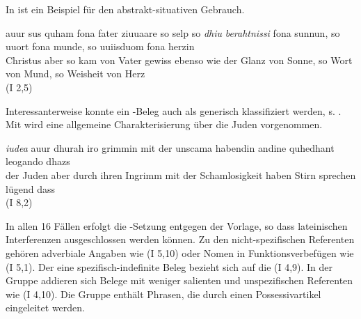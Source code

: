 In  ist ein Beispiel für den abstrakt-situativen  Gebrauch. 
%
\begin{exe}
\ex \label{ex:I683}  {auur} {sus} {quham} {fona} {fater} {ziuuaare} {so selp so} {\textit{dhiu}} {\textit{berahtnissi}} {fona} {sunnun}, {so} {uuort} {fona} {munde}, {so} {uuiisduom} {fona} {herzin} \\
{Christus} {aber} {so} {kam} {von} {Vater} {gewiss} {ebenso wie} {der} {Glanz} {von} {Sonne}, {so} {Wort} {von} {Mund}, {so} {Weisheit} {von} {Herz} {}\\
\glt {} (I 2,5)
\end{exe}

Interessanterweise konnte ein -Beleg auch als generisch  klassifiziert werden, s. . Mit  wird eine allgemeine Charakterisierung über die Juden vorgenommen. 
%

\begin{exe}
\ex \label{ex:I4768}  {\textit{iudea}} {auur} {dhurah} {iro} {grimmin} {mit} {der} {unscama} {habendin} {andine} {quhedhant} {leogando} {dhazs}\\
{der} {Juden} {aber} {durch} {ihren} {Ingrimm} {mit} {der} {Schamlosigkeit} {haben} {Stirn} {sprechen} {lügend} {dass}\\
\glt {}(I 8,2)
\end{exe}

In allen 16 Fällen erfolgt die -Setzung entgegen der Vorlage, so dass lateinischen Interferenzen ausgeschlossen werden können. Zu den nicht-spezifischen Referenten  gehören adverbiale  Angaben wie  (I 5,10) oder Nomen in Funktionsverbefügen wie   (I 5,1). Der eine spezifisch-indefinite  Beleg bezieht sich auf die    (I 4,9). In der Gruppe  addieren sich Belege mit weniger salienten und unspezifischen  Referenten wie   (I 4,10). Die Gruppe   enthält  Phrasen, die durch einen  Possessivartikel eingeleitet werden. 

